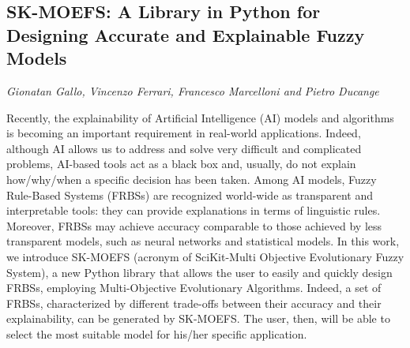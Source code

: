 \documentclass[../booklet.tex]{subfiles}
\begin{document}
\subsection[SK-MOEFS: A Library in Python for Designing Accurate and Explainable Fuzzy Models. {\it Gionatan Gallo, Vincenzo Ferrari, Francesco Marcelloni and Pietro Ducange}]{SK-MOEFS: A Library in Python for Designing Accurate and Explainable Fuzzy Models}
   

\begin{center}
  {\it Gionatan Gallo, Vincenzo Ferrari, Francesco Marcelloni and Pietro Ducange}
\end{center}

\vskip 0.8cm


Recently, the explainability of Artificial Intelligence (AI) models and algorithms is becoming an important requirement in real-world applications. Indeed, although AI allows us to address and solve very difficult and complicated problems, AI-based tools act as a black box and, usually, do not explain how/why/when a specific decision has been taken. Among AI models, Fuzzy Rule-Based Systems (FRBSs) are recognized world-wide as transparent and interpretable tools: they can provide explanations in terms of linguistic rules. Moreover, FRBSs may achieve accuracy comparable to those achieved by less transparent models, such as neural networks and statistical models. In this work, we introduce SK-MOEFS (acronym of SciKit-Multi Objective Evolutionary Fuzzy System), a new Python library that allows the user to easily and quickly design FRBSs, employing Multi-Objective Evolutionary Algorithms. Indeed, a set of FRBSs, characterized by different trade-offs between their accuracy and their explainability, can be generated by SK-MOEFS. The user, then, will be able to select the most suitable model for his/her specific application.

\end{document}

